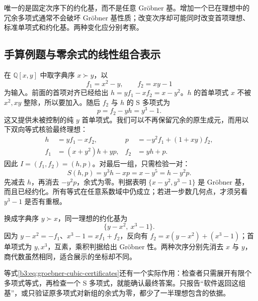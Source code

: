 唯一的是固定次序下的约化基，而不是任意 Gröbner 基。增加一个已在理想中的冗余多项式通常不会破坏 Gröbner 基性质；改变次序却可能同时改变首项理想、标准单项式和约化基。两种变化应分别考察。

\subsection{手算例题与零余式的线性组合表示}
\label{b3:subsec:0802:04}

在 \(\mathbb Q[x,y]\) 中取字典序 \(x\succ y\)，以
\[
	f_1=x^2-y,\qquad f_2=xy-1
\]
为输入。前面的首项对齐已经给出 \(h=yf_1-xf_2=x-y^2\)。\(h\) 的首单项式 \(x\) 不被 \(x^2,xy\) 整除，所以要加入。随后 \(f_2\) 与 \(h\) 的 S 多项式为
\[
	p=f_2-yh=y^3-1.
\]
这又提供未被控制的纯 \(y\) 首单项式。我们可以不再保留冗余的原生成元，而用以下双向等式核验最终理想：
\begin{equation}\label{b3:eq:groebner-cubic-certificates}
	\begin{aligned}
		h&=yf_1-xf_2,& p&=-y^2f_1+(1+xy)f_2,\\
		f_1&=(x+y^2)h+yp,& f_2&=yh+p.
	\end{aligned}
\end{equation}
因此 \(I=(f_1,f_2)=(h,p)\)。对最后一组，只需检验一对：
\[
	S(h,p)=y^3h-xp=x-y^5=h-y^2p.
\]
先减去 \(h\)，再消去 \(-y^2p\)，余式为零。判据表明 \(\{x-y^2,y^3-1\}\) 是 Gröbner 基，而且已经约化。所有等式在任意系数域中仍成立；若进一步数几何点，才须另看 \(y^3-1\) 是否有重根。

\ProseParagraphBreak
换成字典序 \(y\succ x\)，同一理想的约化基为
\[
	\{y-x^2,\ x^3-1\}.
\]
因为 \(y-x^2=-f_1\)、\(x^3-1=xf_1+f_2\)，反向有 \(f_2=x(y-x^2)+(x^3-1)\)；首单项式为 \(y,x^3\)，互素，乘积判据给出 Gröbner 性。两种次序分别先消去 \(x\) 与 \(y\)，商代数虽然相同，适合展示的坐标却不同。

\ProseParagraphBreak
等式\eqref{b3:eq:groebner-cubic-certificates}还有一个实际作用：检查者只需展开有限个多项式等式，再检查一个 S 多项式，就能确认最终答案。只报告“软件返回这组基”，或只验证原多项式对新组的余式为零，都少了一半理想包含的依据。

